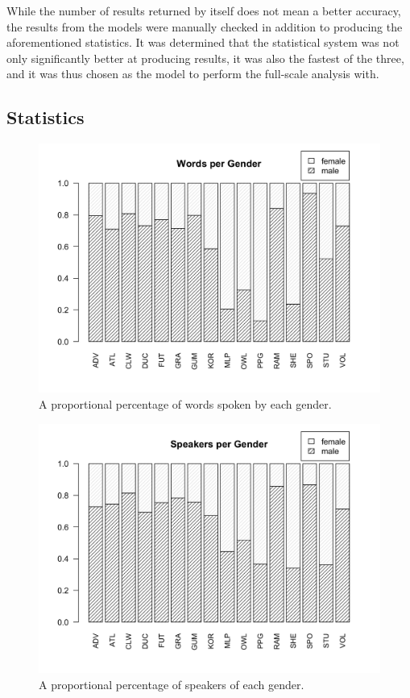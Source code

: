 \documentclass[a4paper, 11pt]{article}
\begin{document}
While the number of results returned by itself does not mean a better accuracy, the results from the models were manually checked in addition to producing the aforementioned statistics. It was determined that the statistical system was not only significantly better at producing results, it was also the fastest of the three, and it was thus chosen as the model to perform the full-scale analysis with.

\subsection{Statistics}

\begin{figure}[t!]
  \includegraphics[width=\linewidth]{figures/worpergen.png}
  \caption{A proportional percentage of words spoken by each gender.}
  \label{fig:worpergen}
\end{figure}

\begin{figure}[t!]
  \includegraphics[width=\linewidth]{figures/spkpergen.png}
  \caption{A proportional percentage of speakers of each gender.}
  \label{fig:spkpergen}
\end{figure}
\end{document}
